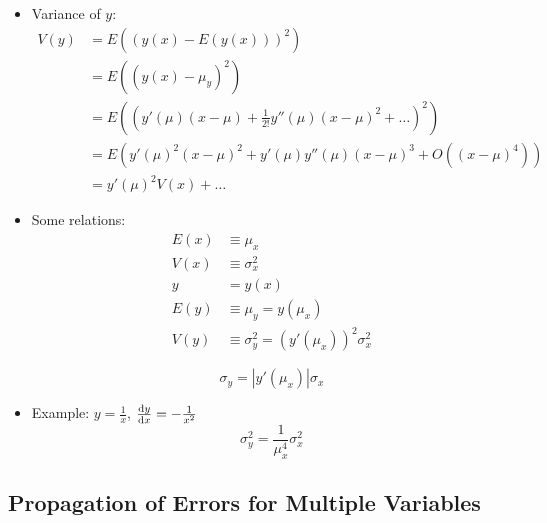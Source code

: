 \begin{itemize}
    \item Variance of $y$:
          \begin{align}
              V(y) & = E((y(x)-E(y(x)))^2)                                               \\
                   & = E((y(x) - \mu_y)^2)                                               \\
                   & = E((y'(\mu)(x-\mu) + \frac{1}{2!} y''(\mu)(x-\mu)^2 + \ldots)^2)   \\
                   & = E(y'(\mu)^2 (x-\mu)^2 + y'(\mu) y''(\mu)(x-\mu)^3 + O((x-\mu)^4)) \\
                   & = y'(\mu)^2 V(x) + \ldots
          \end{align}

    \item Some relations:
          \begin{align*}
              E(x) & \equiv \mu_x                                 \\
              V(x) & \equiv \sigma_x^2                            \\
              y    & = y(x)                                       \\
              E(y) & \equiv \mu_y = y(\mu_x)                      \\
              V(y) & \equiv \sigma_y^2 = (y'(\mu_x))^2 \sigma_x^2
          \end{align*}

          \[ \sigma_y = |y'(\mu_x)| \sigma_x \]

    \item Example: $ y = \frac{1}{x}$, $\dv{y}{x} = -\frac{1}{x^2}$
          \[ \sigma^2_y = \frac{1}{\mu_x^4} \sigma_x^2 \]
\end{itemize}

\subsection{Propagation of Errors for Multiple Variables}

